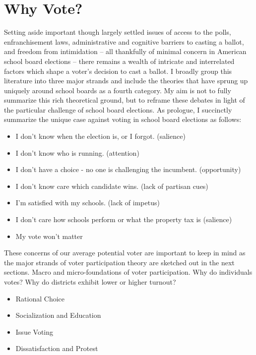 \section{Why Vote?}

Setting aside important though largely settled issues of access to the polls, 
enfranchisement laws, administrative and cognitive barriers to casting a ballot, and 
freedom from intimidation -- all thankfully of minimal concern in American school 
board elections -- there remains a wealth of intricate and interrelated factors 
which shape a voter's decision to cast a ballot. I broadly group this literature 
into three major strands and include the theories that have sprung up uniquely 
around school boards as a fourth category. My aim is not to fully summarize this 
rich theoretical ground, but to reframe these debates in light of the particular 
challenge of school board elections. As prologue, I succinctly summarize the 
unique case against voting in school board elections as follows:

\begin{itemize}
	\item I don't know when the election is, or I forgot. (salience)
	\item I don't know who is running. (attention)
	\item I don't have a choice - no one is challenging the incumbent. (opportunity)
	\item I don't know care which candidate wins. (lack of partisan cues)
	\item I'm satisfied with my schools. (lack of impetus)
	\item I don't care how schools perform or what the property tax is (salience)
	\item My vote won't matter
\end{itemize}

These concerns of our average potential voter are important to keep in mind as 
the major strands of voter participation theory are sketched out in the next 
sections. Macro and micro-foundations of voter participation. Why do individuals 
votes? Why do districts exhibit lower or higher turnout?

\begin{itemize}
	\item Rational Choice
	\item Socialization and Education
	\item Issue Voting
	\item Dissatisfaction and Protest
\end{itemize}


